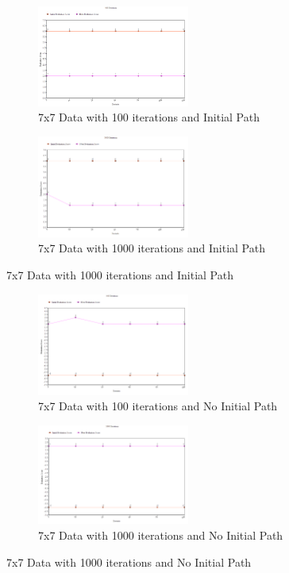 \documentclass[11pt, oneside]{article}   	%
\begin{document}
\begin{figure}[H]
\centering
\begin{subfigure}{.5\textwidth}
	\centering
	\includegraphics[width=50mm]{7x7restart.png}
	\caption{7x7 Data with 100 iterations and Initial Path}
	\label{fig:method}
\end{subfigure}%
\begin{subfigure}{.5\textwidth}
	\centering
	\includegraphics[width=50mm]{7x7restart2.png}
	\caption{7x7 Data with 1000 iterations and Initial Path}
	\label{fig:method}
\end{subfigure}
\end{figure}

\begin{figure}[H]
\centering
\begin{subfigure}{.5\textwidth}
	\centering
	\includegraphics[width=50mm]{7x7restPath.png}
	\caption{7x7 Data with 100 iterations and No Initial Path}
	\label{fig:method}
\end{subfigure}%
\begin{subfigure}{.5\textwidth}
	\centering
	\includegraphics[width=50mm]{7x7restPath2.png}
	\caption{7x7 Data with 1000 iterations and No Initial Path}
	\label{fig:method}
\end{subfigure}
\end{figure}
\end{document}
